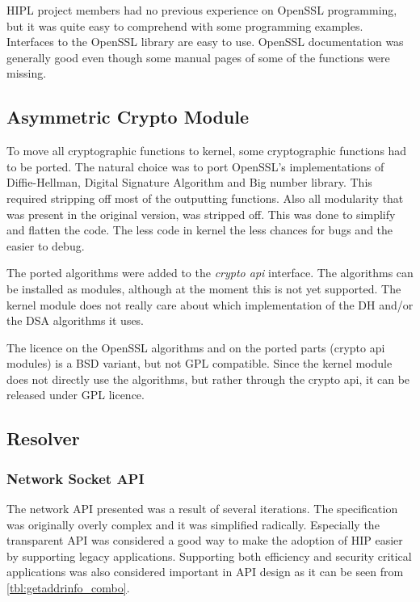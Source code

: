 HIPL project members had no previous experience on OpenSSL
programming, but it was quite easy to comprehend with some programming
examples. Interfaces to the OpenSSL library are easy to use. OpenSSL
documentation was generally good even though some manual pages of some
of the functions were missing.

\subsection{Asymmetric Crypto Module}

To move all cryptographic functions to kernel, some cryptographic
functions had to be ported. The natural choice was to port OpenSSL's
implementations of Diffie-Hellman, Digital Signature Algorithm and Big
number library.  This required stripping off most of the outputting
functions. Also all modularity that was present in the original
version, was stripped off.  This was done to simplify and flatten the
code. The less code in kernel the less chances for bugs and the easier
to debug.

The ported algorithms were added to the \textit{crypto api} interface.
The algorithms can be installed as modules, although at the moment
this is not yet supported. The kernel module does not really care
about which implementation of the DH and/or the DSA algorithms it
uses.

The licence on the OpenSSL algorithms and on the ported parts (crypto
api modules) is a BSD variant, but not GPL compatible.  Since the
kernel module does not directly use the algorithms, but rather through
the crypto api, it can be released under GPL licence.

\subsection{Resolver}

\subsubsection{Network Socket API}
\label{sec:api_lessons}

The network API presented  was a
result of several iterations. The specification was originally overly
complex and it was simplified radically. Especially the transparent
API was considered a good way to make the adoption of HIP easier by
supporting legacy applications. Supporting both efficiency and
security critical applications was also considered important in API
design as it can be seen from \autoref{tbl:getaddrinfo_combo}.

